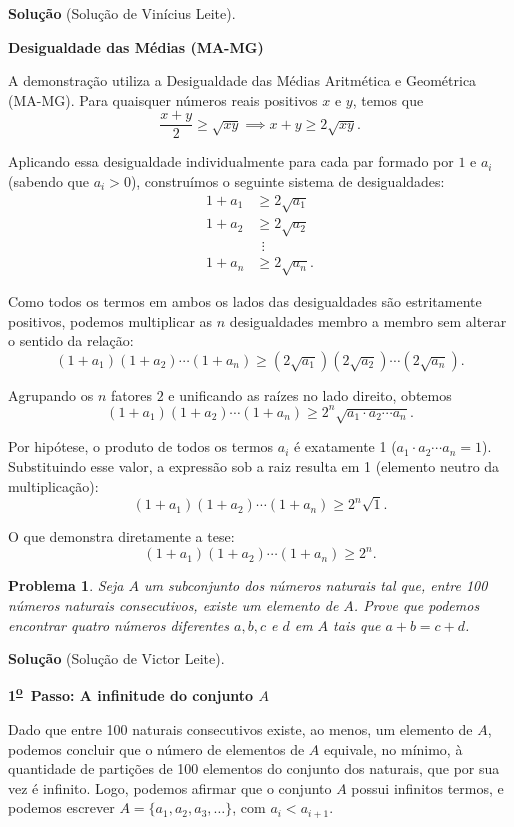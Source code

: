\documentclass{hipatia}
\newcommand{\superou}{\textsuperscript{\underline{o}}~}
\newtheorem{problem*}{Problema}
\begin{document}
\noindent \textbf{Solução} (Solução de Vinícius Leite).

\textbf{Desigualdade das Médias (MA-MG)}

A demonstração utiliza a Desigualdade das Médias Aritmética e Geométrica (MA-MG). Para quaisquer números reais positivos $x$ e $y$, temos que
$$\frac{x+y}{2} \ge \sqrt{xy} \implies x+y \ge 2\sqrt{xy}.$$

Aplicando essa desigualdade individualmente para cada par formado por $1$ e $a_i$ (sabendo que $a_i > 0$), construímos o seguinte sistema de desigualdades:
\begin{align*}
    1+a_1 &\ge 2\sqrt{a_1} \\
    1+a_2 &\ge 2\sqrt{a_2} \\
    &\ \ \vdots \\
    1+a_n &\ge 2\sqrt{a_n}.
\end{align*}

Como todos os termos em ambos os lados das desigualdades são estritamente positivos, podemos multiplicar as $n$ desigualdades membro a membro sem alterar o sentido da relação:
$$(1+a_1)(1+a_2)\cdots(1+a_n) \ge (2\sqrt{a_1})(2\sqrt{a_2})\cdots(2\sqrt{a_n}).$$

Agrupando os $n$ fatores $2$ e unificando as raízes no lado direito, obtemos
$$(1+a_1)(1+a_2)\cdots(1+a_n) \ge 2^n\sqrt{a_1\cdot a_2 \cdots a_n}.$$

Por hipótese, o produto de todos os termos $a_i$ é exatamente 1 ($a_1\cdot a_2 \cdots a_n = 1$). Substituindo esse valor, a expressão sob a raiz resulta em 1 (elemento neutro da multiplicação):
$$(1+a_1)(1+a_2)\cdots(1+a_n) \ge 2^n\sqrt{1}.$$

O que demonstra diretamente a tese:
$$(1+a_1)(1+a_2)\cdots(1+a_n) \ge 2^n.$$



\begin{problem*} Seja $A$ um subconjunto dos números naturais tal que, entre 100 números naturais consecutivos, existe um elemento de $A$. Prove que podemos encontrar quatro números diferentes $a, b, c$ e $d$ em $A$ tais que $a+b = c+d$.  

\end{problem*}

\noindent \textbf{Solução} (Solução de Victor Leite). 

\textbf{1\superou  Passo: A infinitude do conjunto $A$}

Dado que entre 100 naturais consecutivos existe, ao menos, um elemento de $A$, podemos concluir que o número de elementos de $A$ equivale, no mínimo, à quantidade de partições de 100 elementos do conjunto dos naturais, que por sua vez é infinito. Logo, podemos afirmar que o conjunto $A$ possui infinitos termos, e podemos escrever $A = \{ a_1, a_2, a_3, \ldots \}$, com $a_i < a_{i+1}$.
\end{document}
